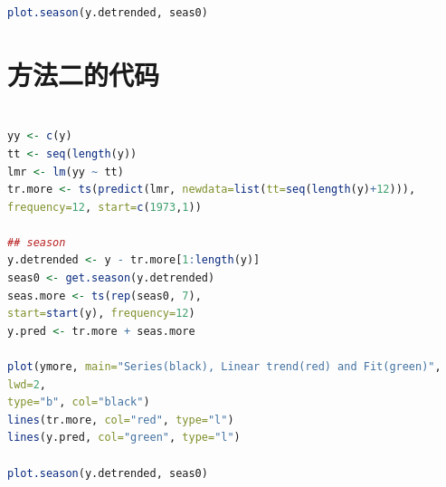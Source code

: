 \documentclass[11pt,a4paper]{ctexart}
\begin{document}
\begin{appendices}
\begin{lstlisting}[language=r]
plot.season(y.detrended, seas0)
\end{lstlisting}

\section{方法二的代码}
\begin{lstlisting}[language=r]

yy <- c(y)
tt <- seq(length(y))
lmr <- lm(yy ~ tt)
tr.more <- ts(predict(lmr, newdata=list(tt=seq(length(y)+12))),
frequency=12, start=c(1973,1))

## season
y.detrended <- y - tr.more[1:length(y)]
seas0 <- get.season(y.detrended)
seas.more <- ts(rep(seas0, 7),
start=start(y), frequency=12)
y.pred <- tr.more + seas.more

plot(ymore, main="Series(black), Linear trend(red) and Fit(green)",
lwd=2,
type="b", col="black")
lines(tr.more, col="red", type="l")
lines(y.pred, col="green", type="l")

plot.season(y.detrended, seas0)
\end{lstlisting}


\end{appendices}
\end{document}
